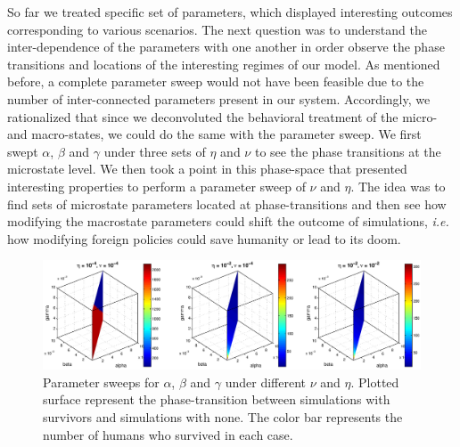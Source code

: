 \documentclass[11pt]{article} %
\begin{document}
So far we treated specific set of parameters, which displayed interesting outcomes corresponding to various scenarios. The next question was to understand the inter-dependence of the parameters with one another in order observe the phase transitions and locations of the interesting regimes of our model. As mentioned before, a complete parameter sweep would not have been feasible due to the number of inter-connected parameters present in our system. Accordingly, we rationalized that since we deconvoluted the behavioral treatment of the micro- and macro-states, we could do the same with the parameter sweep. We first swept $\alpha$, $\beta$ and $\gamma$ under three sets of $\eta$ and $\nu$ to see the phase transitions at the microstate level. We then took a point in this phase-space that presented interesting properties to perform a parameter sweep of $\nu$ and $\eta$. The idea was to find sets of microstate parameters located at phase-transitions and then see how modifying the macrostate parameters could shift the outcome of simulations, \textit{i.e.} how modifying foreign policies could save humanity or lead to its doom.
\begin{figure}[h!]
\centerline{
\includegraphics[scale=0.45]{../images/Matlab_figures/a-b-g-sweep.eps}}
\caption{Parameter sweeps for $\alpha$, $\beta$ and $\gamma$ under different $\nu$ and $\eta$. Plotted surface represent the phase-transition between simulations with survivors and simulations with none. The color bar represents the number of humans who survived in each case.  \label{a-b-g} }
\end{figure}
\end{document}
